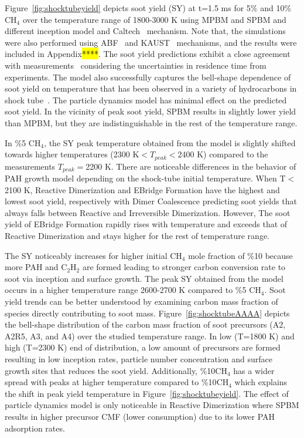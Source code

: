 Figure~\ref{fig:shocktubeyield} depicts soot yield (SY) at t=1.5 ms for 5\% and 10\% $\mathrm{CH_4}$ over the temperature range of 1800-3000 K using MPBM and SPBM and different inception model and Caltech~\citep{blanquart2009chemical} mechanism. Note that, the simulations were also performed using ABF~\citep{appel2000kinetic} and KAUST~\cite{wang2013pah} mechanisms, and the results were included in Appendix\hl{****}. The soot yield predictions exhibit a close agreement with measurements~\citep{agafonov2016unified} considering the uncertainties in residence time from experiments. The model also successfully captures the bell-shape dependence of soot yield on temperature that has been observed in a variety of hydrocarbons in shock tube~\citep{kellerer1996soot,knorre1996soot}. The particle dynamics model has minimal effect on the predicted soot yield. In the vicinity of peak soot yield, SPBM results in slightly lower yield than MPBM, but they are indistinguishable in the rest of the temperature range. 

In \%5 $\mathrm{CH_4}$, the SY peak temperature obtained from the model is slightly shifted towards higher temperatures (2300 K$<T_{peak}<$2400 K) compared to the measurements $T_{peak}=$2200 K. There are noticeable differences in the behavior of PAH growth model depending on the shock-tube initial temperature. When T$<$2100 K, Reactive Dimerization and EBridge Formation have the highest and lowest soot yield, respectively with Dimer Coalescence predicting soot yields that always falls between Reactive and Irreversible Dimerization. However, The soot yield of EBridge Formation rapidly rises with temperature and exceeds that of Reactive Dimerization and stays higher for the rest of temperature range.

The SY noticeably increases for higher initial $\mathrm{CH_4}$ mole fraction of \%10 because more PAH and $\mathrm{C_2H_2}$ are formed leading to stronger carbon conversion rate to soot via inception and surface growth. The peak SY obtained from the model occurs in a higher temperature range 2600-2700 K compared to \%5 $\mathrm{CH_4}$. Soot yield trends can be better understood by examining carbon mass fraction of species directly contributing to soot mass. Figure~\ref{fig:shocktubeAAAA} depicts the bell-shape distribution of the carbon mass fraction of soot precursors (A2, A2R5, A3, and A4) over the studied temperature range. In low (T=1800 K) and high (T=2300 K) end of distribution, a low amount of precursors are formed resulting in low inception rates, particle number concentration and surface growth sites that reduces the soot yield. Additionally, \%10$\mathrm{CH_4}$ has a wider spread with peaks at higher temperature compared to \%10$\mathrm{CH_4}$ which explains the shift in peak yield temperature in Figure~\ref{fig:shocktubeyield}. The effect of particle dynamics model is only noticeable in Reactive Dimerization where SPBM results in higher precursor CMF (lower consumption) due to its lower PAH adsorption rates. %


